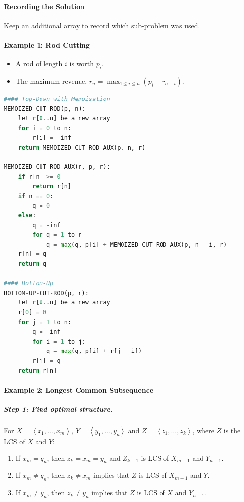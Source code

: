 \documentclass[twocolumn,english]{article}
\numberwithin{equation}{section}
\numberwithin{figure}{section}
\numberwithin{table}{section}
\begin{document}
\paragraph{Recording the Solution}

Keep an additional array to record which sub-problem was used.

\paragraph{Example 1: Rod Cutting}
\begin{itemize}
\item A rod of length $i$ is worth $p_{i}$.
\item The maximum revenue, $r_{n}=\max_{1\leq i\leq n}\left(p_{i}+r_{n-i}\right)$.
\end{itemize}
\begin{lstlisting}[language=Python,basicstyle={\footnotesize\ttfamily},tabsize=4,frame=single]
#### Top-Down with Memoisation
MEMOIZED-CUT-ROD(p, n):
	let r[0..n] be a new array
	for i = 0 to n:
		r[i] = -inf
	return MEMOIZED-CUT-ROD-AUX(p, n, r)

MEMOIZED-CUT-ROD-AUX(n, p, r):
	if r[n] >= 0
		return r[n]
	if n == 0:
		q = 0
	else:
		q = -inf
		for q = 1 to n
			q = max(q, p[i] + MEMOIZED-CUT-ROD-AUX(p, n - i, r)
	r[n] = q
	return q

#### Bottom-Up
BOTTOM-UP-CUT-ROD(p, n):
	let r[0..n] be a new array
	r[0] = 0
	for j = 1 to n:
		q = -inf
		for i = 1 to j:
			q = max(q, p[i] + r[j - i])
		r[j] = q
	return r[n]
\end{lstlisting}

\paragraph{Example 2: Longest Common Subsequence}

\subparagraph{Step 1: Find optimal structure.}

For $X=\left\langle x_{1},\dots,x_{m}\right\rangle $, $Y=\left\langle y_{1},\dots,y_{n}\right\rangle $
and $Z=\left\langle z_{1},\dots,z_{k}\right\rangle $, where $Z$
is the LCS of $X$ and $Y$:
\begin{enumerate}
\item If $x_{m}=y_{n}$, then $z_{k}=x_{m}=y_{n}$ and $Z_{k-1}$ is LCS
of $X_{m-1}$ and $Y_{n-1}$.
\item If $x_{m}\neq y_{n}$, then $z_{k}\neq x_{m}$ implies that $Z$ is
LCS of $X_{m-1}$ and $Y$.
\item If $x_{m}\neq y_{n}$, then $z_{k}\neq y_{n}$ implies that $Z$ is
LCS of $X$ and $Y_{n-1}$.
\end{enumerate}
\end{document}
